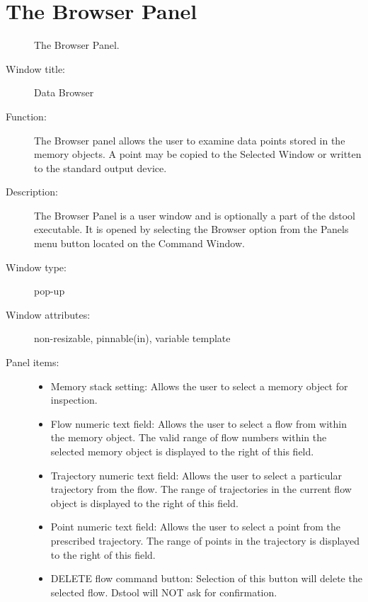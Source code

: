 \section{The Browser Panel} 
%
%
%
\begin{figure}[h]
\vspace{.5in}
\centerline{}
\caption{\label{Browser}
The Browser Panel.
}
\end{figure}

%
%
%
\begin{description}

\item[Window title:] Data Browser
\item[Function:] The Browser panel allows the user to examine data points
	stored in the memory objects.  A point may be copied to the Selected
	Window or written to the standard output device.
\item[Description:] The Browser Panel is a user window and is optionally
	a part of the dstool executable.  It is opened by selecting the
	Browser option from the Panels menu button located on the Command
	Window.  
\item[Window type:] pop-up    
\item[Window attributes:] non-resizable, pinnable(in), variable template
\item[Panel items:]\mbox{}
	\begin{itemize}
	\item Memory stack setting: Allows the user to select a memory object
		for inspection.
	\item Flow numeric text field: Allows the user to select a flow
		from within the memory object.  The valid range of flow
		numbers within the selected memory object is displayed
		to the right of this field.
	\item Trajectory numeric text field:  Allows the user to select
		a particular trajectory from the flow.  The range
		of trajectories in the current flow object is displayed
		to the right of this field.
	\item Point numeric text field: Allows the user to select a point
		from the prescribed trajectory.  The range of points in the 
		trajectory is displayed to the right of this field.
	\item DELETE flow command button: Selection of this button will delete the 
		selected flow.  Dstool will NOT ask for confirmation.

\end{itemize}
\end{description}
